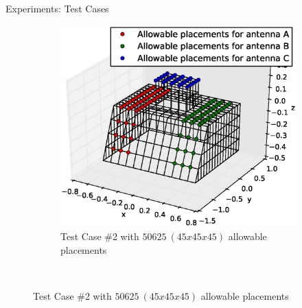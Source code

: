 \documentclass{beamer}
\begin{document}
\begin{frame}{Experiments: Test Cases}
\begin{figure}
\begin{subfigure}{.5\columnwidth}
            \includegraphics[width=\columnwidth, height=\columnwidth]{../paper/FIG/tc2_figure}%
            \caption*{\tiny Test Case \#2 with $50625~(45x45x45)$ allowable placements}%
        \end{subfigure}\hfill\\%
    \end{figure}
\end{frame}
\end{document}
